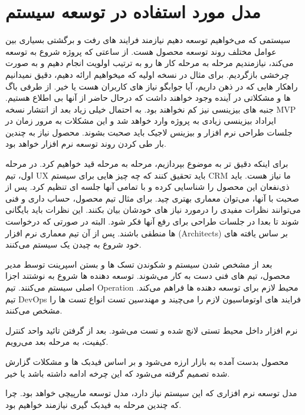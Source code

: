 \newpage

\section{مدل مورد استفاده در توسعه سیستم}
سیستمی که می‌خواهیم توسعه دهیم نیازمند فرایند های رفت و برگشتی بسیاری بین عوامل مختلف روند توسعه محصول هست. از ساعتی که پروژه شروع به توسعه می‌کند، 
نیازمندیم مرحله به مرحله کار ها رو به ترتیب اولویت انجام دهیم و به صورت چرخشی بازگردیم. برای مثال در نسخه اولیه که میخواهیم ارائه دهیم، دقیق نمیدانیم راهکار هایی که
در ذهن داریم، آیا جوابگو نیاز های کاربران هست یا خیر. از طرفی باگ ها و مشکلاتی در آینده وجود خواهند داشت که درحال حاضر از آنها بی اطلاع  هستیم.
جنبه های بیزینسی نیز کم نخواهند بود. به احتمال خیلی زیاد بعد از انتشار نسخه MVP ایراداد بیزینسی زیادی به پروژه وارد خواهد شد و این مشکلات به مرور زمان
در جلسات طراحی نرم افزار و بیزینس لاجیک باید صحبت بشوند. محصول نیاز به چندین بار طی کردن روند توسعه نرم افزار خواهد بود.

برای اینکه دقیق تر به موضوع بپردازیم، مرحله به مرحله قید خواهیم کرد. در مرحله اول، تیم UX باید تحقیق کنند که چه چیز هایی برای سیستم CRM ما نیاز هست.
باید ذی‌نفعان این محصول را شناسایی کرده و با تمامی آنها جلسه ای تنظیم کرد. پس از صحبت با آنها، می‌توان معماری بهتری چید.
برای مثال تیم محصول، حساب داری و فنی می‌توانند نظرات مفیدی را درمورد نیاز های خودشان بیان بکنند. این نظرات باید بایگانی شوند تا بعدا در جلسات طراحی برای 
رفع آنها فکر شود. البته در صورتی که درخواست ها منطقی باشند.
پس از آن تیم معماری نرم افزار (Architects) بر ساس یافته های خود شروع به چیدن یک سیستم می‌کنند.

بعد از مشخص شدن سیستم و شکوندن تسک ها و بستن اسپرینت توسط مدیر محصول، تیم های فنی دست به کار می‌شوند. توسعه دهنده ها شروع به نوشتند اجزا اصلی 
سیستم می‌کنند. تیم Operation محیط لازم برای توسعه دهنده ها فراهم می‌کند.
تیم DevOps فرایند های اوتوماسیون لازم را می‌چیند و مهندسین تست انواع تست ها را مشخص می‌کنند.

نرم افزار داخل محیط تستی لانچ شده و تست می‌شود. بعد از گرفتن تائید واحد کنترل کیفیت، به مرحله بعد می‌رویم.

محصول بدست آمده به بازار ارزه می‌شود و بر اساس فیدبک ها و مشکلات گزارش شده تصمیم گرفته می‌شود که این چرخه ادامه داشته باشد یا خیر.

مدل توسعه نرم افزاری که این سیستم نیاز دارد، مدل توسعه مارپیچی خواهد بود. چرا که چندین مرحله به فیدبک گیری نیازمند خواهیم بود.

